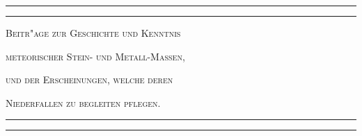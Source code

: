 \documentclass[a4paper, 11pt, oneside, german]{article}
\begin{document}
\swabfamily
\renewcommand{\contentsname}{
\swabfamily{Inhaltsverzeichnis}
}
\let\origcftsecfont\cft
\let\origcftsecpagefont\cftsecpagefont
\let\origcftsecafterpnum\cftsecafterpnum
\renewcommand{\cftsecpagefont}{\swabfamily{\origcftsecpagefont}}
\renewcommand{\cftsecafterpnum}{\swabfamily{\origcftsecafterpnum}}
\let\origcftsubsecpagefont\cftsubsecpagefont
\let\origcftsubsecafterpnum\cftsubsecafterpnum
\renewcommand{\cftsubsecpagefont}{\swabfamily{\origcftsubsecpagefont}}
\renewcommand{\cftsubsecafterpnum}{\swabfamily{\origcftsubsecafterpnum}}
\let\origcftsubsubsecpagefont\cftsubsubsecpagefont
\let\origcftsubsubsecafterpnum\cftsubsubsecafterpnum
\renewcommand{\cftsubsubsecpagefont}{\swabfamily{\origcftsubsubsecpagefont}}
\renewcommand{\cftsubsubsecafterpnum}{\swabfamily{\origcftsubsubsecafterpnum}}
\begin{titlepage} %
	\centering %

	
	\rule{\textwidth}{1.6pt}\vspace*{-\baselineskip}\vspace*{2pt} %
	\rule{\textwidth}{0.4pt} %
	
	\vspace{1.5\baselineskip} %
	
	{\scshape\huge Beitr"age zur Geschichte und Kenntnis }
	
	\vspace{1\baselineskip} %

	{\scshape\huge meteorischer Stein- und Metall-Massen, }

	\vspace{1\baselineskip} %

 	{\scshape\huge und der Erscheinungen, welche deren }

	\vspace{1\baselineskip} %

	{\scshape\huge Niederfallen zu begleiten pflegen.}

	\vspace{1.5\baselineskip} %

	\rule{\textwidth}{0.4pt}\vspace*{-\baselineskip}\vspace{3.2pt} %
	\rule{\textwidth}{1.6pt} %
	

\end{titlepage}
\end{document}
